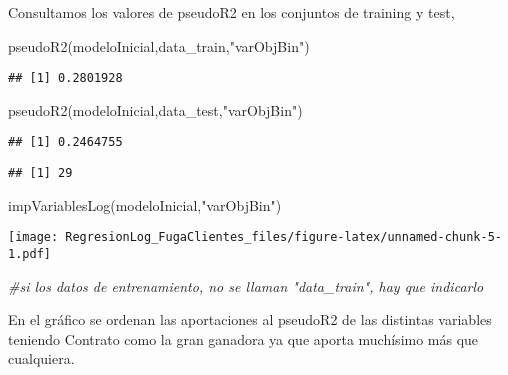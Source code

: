 \documentclass[
]{article}
\newenvironment{Shaded}{\begin{snugshade}}{\end{snugshade}}
\newcommand{\CommentTok}[1]{\textcolor[rgb]{0.56,0.35,0.01}{\textit{#1}}}
\newcommand{\FunctionTok}[1]{\textcolor[rgb]{0.00,0.00,0.00}{#1}}
\newcommand{\NormalTok}[1]{#1}
\newcommand{\SpecialCharTok}[1]{\textcolor[rgb]{0.00,0.00,0.00}{#1}}
\newcommand{\StringTok}[1]{\textcolor[rgb]{0.31,0.60,0.02}{#1}}
\begin{document}
Consultamos los valores de pseudoR2 en los conjuntos de training y test,

\begin{Shaded}
\begin{Highlighting}[]
\FunctionTok{pseudoR2}\NormalTok{(modeloInicial,data\_train,}\StringTok{"varObjBin"}\NormalTok{)}
\end{Highlighting}
\end{Shaded}

\begin{verbatim}
## [1] 0.2801928
\end{verbatim}

\begin{Shaded}
\begin{Highlighting}[]
\FunctionTok{pseudoR2}\NormalTok{(modeloInicial,data\_test,}\StringTok{"varObjBin"}\NormalTok{)}
\end{Highlighting}
\end{Shaded}

\begin{verbatim}
## [1] 0.2464755
\end{verbatim}

\begin{Shaded}
\end{Shaded}

\begin{verbatim}
## [1] 29
\end{verbatim}

\begin{Shaded}
\begin{Highlighting}[]
\FunctionTok{impVariablesLog}\NormalTok{(modeloInicial,}\StringTok{"varObjBin"}\NormalTok{) }
\end{Highlighting}
\end{Shaded}

\texttt{[image: RegresionLog\_FugaClientes\_files/figure-latex/unnamed-chunk-5-1.pdf]}

\begin{Shaded}
\begin{Highlighting}[]
\CommentTok{\#si los datos de entrenamiento, no se llaman "data\_train", hay que indicarlo}
\end{Highlighting}
\end{Shaded}

En el gráfico se ordenan las aportaciones al pseudoR2 de las distintas
variables teniendo Contrato como la gran ganadora ya que aporta
muchísimo más que cualquiera.
\end{document}
